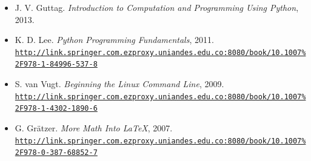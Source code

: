 \documentclass[letterpaper,10pt,onecolumn]{article}
\begin{document}
\begin{itemize}
	\item J. V. Guttag. \textit{Introduction to Computation and Programming Using Python}, 2013.
	\item K. D. Lee. \textit{Python Programming Fundamentals}, 2011. \\
	\href{http://link.springer.com.ezproxy.uniandes.edu.co:8080/book/10.1007\%2F978-1-84996-537-8}{\nolinkurl{http://link.springer.com.ezproxy.uniandes.edu.co:8080/book/10.1007\%2F978-1-84996-537-8}}\\[-0.6cm]
	\item S. van Vugt. \textit{Beginning the Linux Command Line}, 2009.\\
	\href{http://link.springer.com.ezproxy.uniandes.edu.co:8080/book/10.1007\%2F978-1-4302-1890-6}{\nolinkurl{http://link.springer.com.ezproxy.uniandes.edu.co:8080/book/10.1007\%2F978-1-4302-1890-6}}\\[-0.6cm]
	\item G. Gr\"atzer. \textit{More Math Into  \LaTeX}, 2007.\\
	\href{http://link.springer.com.ezproxy.uniandes.edu.co:8080/book/10.1007\%2F978-0-387-68852-7}{\nolinkurl{http://link.springer.com.ezproxy.uniandes.edu.co:8080/book/10.1007\%2F978-0-387-68852-7}}
\end{itemize}
\end{document}
